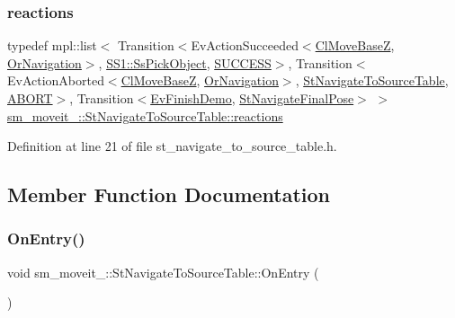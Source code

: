 \subsubsection{\texorpdfstring{reactions}{reactions}}
{\footnotesize\ttfamily typedef mpl\+::list$<$ Transition$<$Ev\+Action\+Succeeded$<$\hyperlink{classcl__move__base__z_1_1ClMoveBaseZ}{Cl\+Move\+BaseZ}, \hyperlink{classsm__moveit__4_1_1OrNavigation}{Or\+Navigation}$>$, \hyperlink{structsm__moveit__4_1_1SS1_1_1SsPickObject}{S\+S1\+::\+Ss\+Pick\+Object}, \hyperlink{classSUCCESS}{S\+U\+C\+C\+E\+SS}$>$, Transition$<$Ev\+Action\+Aborted$<$\hyperlink{classcl__move__base__z_1_1ClMoveBaseZ}{Cl\+Move\+BaseZ}, \hyperlink{classsm__moveit__4_1_1OrNavigation}{Or\+Navigation}$>$, \hyperlink{structsm__moveit__4_1_1StNavigateToSourceTable}{St\+Navigate\+To\+Source\+Table}, \hyperlink{classABORT}{A\+B\+O\+RT}$>$, Transition$<$\hyperlink{structsm__moveit__4_1_1EvFinishDemo}{Ev\+Finish\+Demo}, \hyperlink{structsm__moveit__4_1_1StNavigateFinalPose}{St\+Navigate\+Final\+Pose}$>$ $>$ \hyperlink{structsm__moveit__4_1_1StNavigateToSourceTable_ae1b19f752700392a40f225b02d677571}{sm\+\_\+moveit\+\_\+::\+St\+Navigate\+To\+Source\+Table\+::reactions}}



Definition at line 21 of file st\+\_\+navigate\+\_\+to\+\_\+source\+\_\+table.\+h.



\subsection{Member Function Documentation}
\mbox{\label{structsm__moveit__4_1_1StNavigateToSourceTable_aa90111c5a22ed67dfe20024a7b135837}} 
\subsubsection{\texorpdfstring{On\+Entry()}{OnEntry()}}
{\footnotesize\ttfamily void sm\+\_\+moveit\+\_\+::\+St\+Navigate\+To\+Source\+Table\+::\+On\+Entry (\begin{DoxyParamCaption}{ }\end{DoxyParamCaption})\hspace{0.3cm}{\ttfamily [inline]}}



